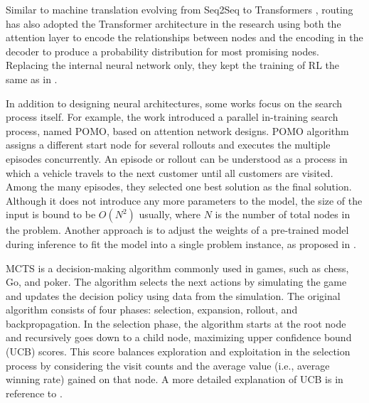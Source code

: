 \documentclass{article}
\begin{document}
Similar to machine translation evolving from Seq2Seq to Transformers \cite{vaswaniAttentionAllYou2017}, routing has also adopted the Transformer architecture in the research \cite{kool2018attention} using both the attention layer to encode the relationships between nodes and the encoding in the decoder to produce a probability distribution for most promising nodes. Replacing the internal neural network only, they kept the training of RL the same as in \cite{belloNeuralCombinatorialOptimization2017}.

In addition to designing neural architectures, some works focus on the search process itself. For example, the work \cite{kwonPOMOPolicyOptimization2021} introduced a parallel in-training search process, named POMO, based on attention network designs. POMO algorithm assigns a different start node for several rollouts and executes the multiple episodes concurrently. An episode or rollout can be understood as a process in which a vehicle travels to the next customer until all customers are visited. Among the many episodes, they selected one best solution as the final solution. Although it does not introduce any more parameters to the model, the size of the input is bound to be $O\left(N^2\right)$ usually, where $N$ is the number of total nodes in the problem. Another approach is to adjust the weights of a pre-trained model during inference to fit the model into a single problem instance, as proposed in \cite{hottungEfficientActiveSearch2022}.


MCTS is a decision-making algorithm commonly used in games, such as chess, Go, and poker. The algorithm selects the next actions by simulating the game and updates the decision policy using data from the simulation. The original algorithm consists of four phases: selection, expansion, rollout, and backpropagation. In the selection phase, the algorithm starts at the root node and recursively goes down to a child node, maximizing upper confidence bound (UCB) scores. This score balances exploration and exploitation in the selection process by considering the visit counts and the average value (i.e., average winning rate) gained on that node. A more detailed explanation of UCB is in reference to \cite{bubeckRegretAnalysisStochastic2012}.
\end{document}
